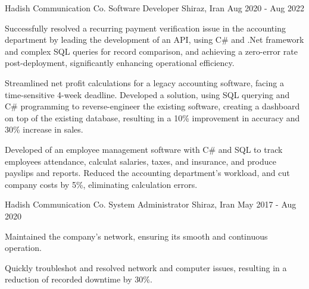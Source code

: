 

\begin{cventries}

    \cventry
    {Hadish Communication Co.} %
    {Software Developer} %
    {Shiraz, Iran} %
    {Aug 2020 - Aug 2022} %
    {
      \begin{cvitems} %
        \item{Successfully resolved a recurring payment verification issue in the accounting department by leading the development of an API, using C\# and .Net framework and complex SQL queries for record comparison, and achieving a zero-error rate post-deployment, significantly enhancing operational efficiency.}
        \item{Streamlined net profit calculations for a legacy accounting software, facing a time-sensitive 4-week deadline. Developed a solution, using SQL querying and C\# programming to reverse-engineer the existing software, creating a dashboard on top of the existing database, resulting in a 10\% improvement in accuracy and 30\% increase in sales.}
        \item{Developed of an employee management software with C\# and SQL to track employees attendance, calculat salaries, taxes, and insurance, and produce payslips and reports. Reduced the accounting department's workload, and cut company costs by 5\%, eliminating calculation errors.}
      \end{cvitems}
    }%
    \cventry
    {Hadish Communication Co.} %
    {System Administrator} %
    {Shiraz, Iran} %
    {May 2017 - Aug 2020} %
    {
      \begin{cvitems} %
        \item {Maintained the company's network, ensuring its smooth and continuous operation.}
        \item {Quickly troubleshot and resolved network and computer issues, resulting in a reduction of recorded downtime by 30\%.}

\end{cvitems}}
\end{cventries}
